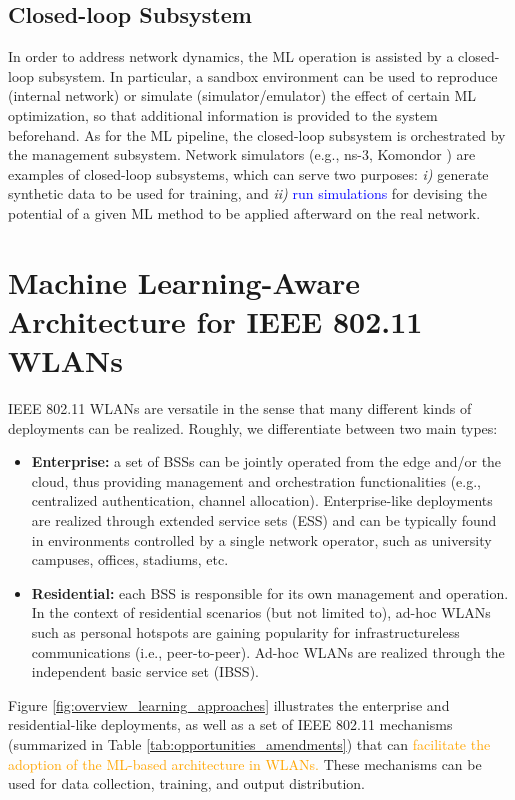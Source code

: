 \documentclass[journal]{IEEEtran}
\begin{document}
\subsection{Closed-loop Subsystem} 
In order to address network dynamics, the ML operation is assisted by a closed-loop subsystem. In particular, a sandbox environment can be used to reproduce (internal network) or simulate (simulator/emulator) the effect of certain ML optimization, so that additional information is provided to the system beforehand. As for the ML pipeline, the closed-loop subsystem is orchestrated by the management subsystem. Network simulators (e.g., ns-3, Komondor \cite{barrachina2019komondor}) are examples of closed-loop subsystems, which can serve two purposes: \emph{i)} generate synthetic data to be used for training, and \emph{ii)} \textcolor{blue}{run simulations} for devising the potential of a given ML method to be applied afterward on the real network.

\section{Machine Learning-Aware Architecture for IEEE 802.11 WLANs}
\label{section:wlans_architecture}

IEEE 802.11 WLANs are versatile in the sense that many different kinds of deployments can be realized. Roughly, we differentiate between two main types:
\begin{itemize}
	\item \textbf{Enterprise:} a set of BSSs can be jointly operated from the edge and/or the cloud, thus providing management and orchestration functionalities (e.g., centralized authentication, channel allocation). Enterprise-like deployments are realized through extended service sets (ESS) and can be typically found in environments controlled by a single network operator, such as university campuses, offices, stadiums, etc. 
	\item \textbf{Residential:} each BSS is responsible for its own management and operation. In the context of residential scenarios (but not limited to), ad-hoc WLANs such as personal hotspots are gaining popularity for infrastructureless communications (i.e., peer-to-peer). Ad-hoc WLANs are realized through the independent basic service set (IBSS).
\end{itemize}

Figure \ref{fig:overview_learning_approaches} illustrates the enterprise and residential-like deployments, as well as a set of IEEE 802.11 mechanisms (summarized in Table \ref{tab:opportunities_amendments}) that can \textcolor{orange}{facilitate the adoption of the ML-based architecture in WLANs.} These mechanisms can be used for data collection, training, and output distribution.
\end{document}
